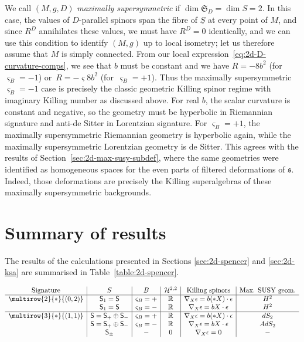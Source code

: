 \documentclass[10pt,a4paper]{amsart}
\numberwithin{equation}{section}
\newcommand{\fs}{\mathfrak{s}}
\newcommand{\fS}{\mathfrak{S}}
\newcommand{\RR}{\mathbb{R}}
\newcommand{\cH}{\mathcal{H}}
\newcommand{\ssS}{\mathsf{S}}
\newcommand{\Sbundle}{\underline{S}}
\newcommand{\1}{\mathbbm{1}}
\begin{document}
We call $(M,g,D)$ \emph{maximally supersymmetric} if $\dim\fS_D=\dim S=2$. In this case, the values of $D$-parallel spinors span the fibre of $\Sbundle$ at every point of $M$, and since $R^D$ annihilates these values, we must have $R^D=0$ identically, and we can use this condition to identify $(M,g)$ up to local isometry; let us therefore assume that $M$ is simply connected. From our local expression~\eqref{eq:2d-D-curvature-comps}, we see that $b$ must be constant and we have $R=-8b^2 $ (for $\varsigma_B=-1$) or~${R=-\varsigma 8b^2}$ (for~${\varsigma_B=+1}$). Thus the maximally supersymmetric $\varsigma_B=-1$ case is precisely the classic geometric Killing spinor regime with imaginary Killing number as discussed above. For real $b$, the scalar curvature is constant and negative, so the geometry must be hyperbolic in Riemannian signature and anti-de Sitter in Lorentzian signature. For $\varsigma_B=+1$, the maximally supersymmetric Riemannian geometry is hyperbolic again, while the maximally supersymmetric Lorentzian geometry is de Sitter. This agrees with the results of Section~\ref{sec:2d-max-susy-subdef}, where the same geometries were identified as homogeneous spaces for the even parts of filtered deformations of $\fs$. Indeed, those deformations are precisely the Killing superalgebras of these maximally supersymmetric backgrounds.

\section{Summary of results}

The results of the calculations presented in Sections \ref{sec:2d-spencer} and \ref{sec:2d-ksa} are summarised in Table~\ref{table:2d-spencer}.

\begin{table}[ht]
\centering
	\caption{Summary of results, including the Spencer $(2,2)$-cohomology group, a characterisation of the Killing spinors for the admissible connection and the (non-trivial) maximally supersymmetric geometries.}
	\label{table:2d-spencer}
\vspace{1mm}

	\setlength{\extrarowheight}{1.2ex}
	$\begin{array}{c|c|c|c|c|c}
		\text{Signature}	& S		& B		& \cH^{2,2}	& \text{Killing spinors}	& \text{Max. SUSY geom.}	\\
		\hline
		\multirow{2}{*}{(0,2)}	
		& \ssS_1=\ssS	& \varsigma_B = +		& \RR	& \nabla_X\epsilon=b(*X)\cdot \epsilon	& H^2	\\
		& \ssS_1=\ssS 	& \varsigma_B = -		& \RR	& \nabla_X\epsilon=bX\cdot \epsilon		& H^2	\\
		\hline
		\multirow{3}{*}{(1,1)}	
		& \ssS=\ssS_+\oplus\ssS_-	& \varsigma_B = +	& \RR	& \nabla_X\epsilon=b(*X)\cdot \epsilon	& dS_2	\\
		& \ssS=\ssS_+\oplus\ssS_-	& \varsigma_B = -	& \RR	& \nabla_X\epsilon=bX\cdot \epsilon		& AdS_2	\\
		& \ssS_\pm					& -				& 0		& \nabla_X\epsilon=0					& -	
	\end{array}$
\end{table}
\end{document}

